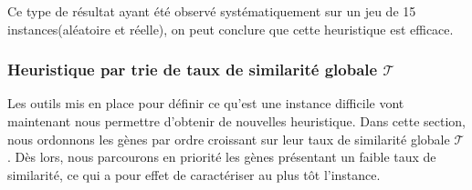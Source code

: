 \documentclass[a4paper,10pt]{article}
\begin{document}
Ce type de résultat ayant été observé systématiquement sur un jeu de 15 instances(aléatoire et réelle), on peut conclure que cette heuristique est efficace.


\subsubsection{Heuristique par trie de taux de similarité globale $\mathcal{T}$ }
Les outils mis en place pour définir ce qu'est une instance difficile vont maintenant nous permettre d'obtenir de nouvelles heuristique. Dans cette section, nous ordonnons les gènes par ordre croissant sur leur taux de similarité globale $\mathcal{T}$. Dès lors, nous parcourons en priorité les gènes présentant un faible taux de similarité, ce qui a pour effet de caractériser au plus tôt l'instance.
\end{document}

